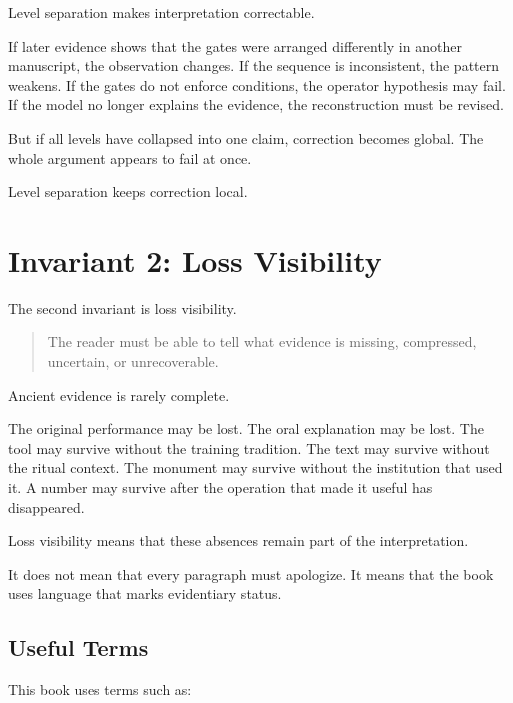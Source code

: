 \documentclass[11pt]{book}
\begin{document}
Level separation makes interpretation correctable.

If later evidence shows that the gates were arranged differently in another manuscript, the observation changes. If the sequence is inconsistent, the pattern weakens. If the gates do not enforce conditions, the operator hypothesis may fail. If the model no longer explains the evidence, the reconstruction must be revised.

But if all levels have collapsed into one claim, correction becomes global. The whole argument appears to fail at once.

Level separation keeps correction local.

\section{Invariant 2: Loss Visibility}

The second invariant is loss visibility.

\begin{quote}
The reader must be able to tell what evidence is missing, compressed, uncertain, or unrecoverable.
\end{quote}

Ancient evidence is rarely complete.

The original performance may be lost. The oral explanation may be lost. The tool may survive without the training tradition. The text may survive without the ritual context. The monument may survive without the institution that used it. A number may survive after the operation that made it useful has disappeared.

Loss visibility means that these absences remain part of the interpretation.

It does not mean that every paragraph must apologize. It means that the book uses language that marks evidentiary status.

\subsection{Useful Terms}

This book uses terms such as:
\end{document}
